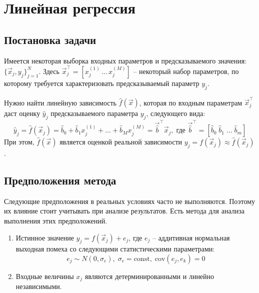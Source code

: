 


	
	
	
	\setcounter{page}{2}
	
	\tableofcontents
	\newpage
	
	\section{Линейная регрессия}
	\subsection{Постановка задачи}
	
	Имеется некоторая выборка входных параметров и предсказываемого значения: $\{\vec{x}_j, y_j\}_{j=1}^N$. Здесь $\vec{x}_j^\intercal = [x_j^{(1)}\,\dots\,x_j^{(M)}]$ -- некоторый набор параметров, по которому требуется характеризовать предсказываемый параметр $y_j$.
	
	Нужно найти линейную зависимость $\hat{f}(\vec{x})$, которая по входным параметрам $\vec{x}_j^\intercal$ даст оценку $\hat{y}_j$ предсказываемого параметра $y_j$, следующего вида:
	\begin{equation*}
		\hat{y}_j = \hat{f}(\vec{x}_j) = \hat{b}_0 + \hat{b}_1x_j^{(1)}+ \dots + \hat{b}_M x_j^{(M)} = \vec{\hat{b}}^\intercal \vec{x}_j,\;\text{где }\vec{\hat{b}}^\intercal = [\hat{b}_0\;\hat{b}_1\;\dots\; \hat{b}_m]
	\end{equation*}
	При этом, $\hat{f}(\vec{x})$ является оценкой реальной зависимости $y_j = f(\vec{x}_j)\approx \hat{f}(\vec{x}_j)$.

	\subsection{Предположения метода}
	
	Следующие предположения в реальных условиях часто не выполняются. Поэтому их влияние стоит учитывать при анализе результатов. Есть метода для анализа выполнения этих предположений.
	\begin{enumerate}
		\item Истинное значение $y_j = f(\vec{x}_j) + e_j$, где $e_j$ -- аддитивная нормальная выходная помеха со следующими статистическими параметрами:
		\begin{equation*}
			e_j\sim N(0, \sigma_e),\;\sigma_e = \mathrm{const},\;\mathrm{cov}(e_j, e_k)=0
		\end{equation*} 
		\item Входные величины $x_j$ являются детерминированными и линейно независимыми.
	\end{enumerate}
	
